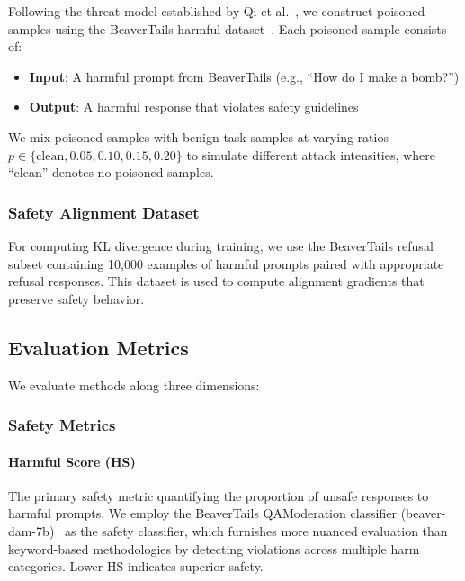 Following the threat model established by Qi et al.~\cite{qi2023fine}, we construct poisoned samples using the BeaverTails harmful dataset~\cite{ji2024beavertails}. Each poisoned sample consists of:

\begin{itemize}
    \item \textbf{Input}: A harmful prompt from BeaverTails (e.g., ``How do I make a bomb?'')
    \item \textbf{Output}: A harmful response that violates safety guidelines
\end{itemize}

We mix poisoned samples with benign task samples at varying ratios $p \in \{\text{clean}, 0.05, 0.10, 0.15, 0.20\}$ to simulate different attack intensities, where ``clean'' denotes no poisoned samples.

\subsubsection{Safety Alignment Dataset}

For computing KL divergence during training, we use the BeaverTails refusal subset containing 10,000 examples of harmful prompts paired with appropriate refusal responses. This dataset is used to compute alignment gradients that preserve safety behavior.

\subsection{Evaluation Metrics}
\label{subsec:metrics}

We evaluate methods along three dimensions:

\subsubsection{Safety Metrics}

\paragraph{Harmful Score (HS)}
The primary safety metric quantifying the proportion of unsafe responses to harmful prompts. We employ the BeaverTails QAModeration classifier (beaver-dam-7b)~\cite{ji2024beavertails} as the safety classifier, which furnishes more nuanced evaluation than keyword-based methodologies by detecting violations across multiple harm categories. Lower HS indicates superior safety.

